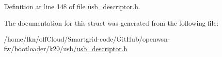 Definition at line 148 of file usb\+\_\+descriptor.\+h.



The documentation for this struct was generated from the following file\+:\begin{DoxyCompactItemize}
\item 
/home/lkn/off\+Cloud/\+Smartgrid-\/code/\+Git\+Hub/openwsn-\/fw/bootloader/k20/usb/\hyperlink{usb__descriptor_8h}{usb\+\_\+descriptor.\+h}\end{DoxyCompactItemize}
